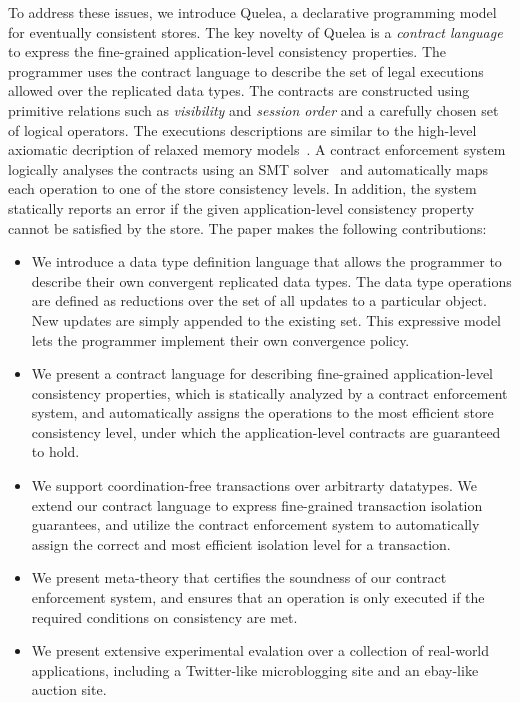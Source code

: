 \documentclass[pldi]{sigplanconf}
\begin{document}
To address these issues, we introduce Quelea, a declarative programming model
for eventually consistent stores. The key novelty of Quelea is a \emph{contract
language} to express the fine-grained application-level consistency properties.
The programmer uses the contract language to describe the set of legal
executions allowed over the replicated data types. The contracts are
constructed using primitive relations such as \emph{visibility} and
\emph{session order} and a carefully chosen set of logical operators. The
executions descriptions are similar to the high-level axiomatic decription of
relaxed memory models~\cite{Demange2013}. A contract enforcement system
logically analyses the contracts using an SMT solver~\cite{} and automatically
maps each operation to one of the store consistency levels. In addition, the
system statically reports an error if the given application-level consistency
property cannot be satisfied by the store. The paper makes the following
contributions:

\begin{itemize}

\item We introduce a data type definition language that allows the programmer
to describe their own convergent replicated data types. The data type
operations are defined as reductions over the set of all updates to a
particular object. New updates are simply appended to the existing set. This
expressive model lets the programmer implement their own convergence policy.

\item We present a contract language for describing fine-grained
application-level consistency properties, which is statically analyzed by a
contract enforcement system, and automatically assigns the operations to the
most efficient store consistency level, under which the application-level
contracts are guaranteed to hold.

\item We support coordination-free transactions over arbitrarty datatypes. We
extend our contract language to express fine-grained transaction isolation
guarantees, and utilize the contract enforcement system to automatically assign
the correct and most efficient isolation level for a transaction.

\item We present meta-theory that certifies the soundness of our contract
enforcement system, and ensures that an operation is only executed if the
required conditions on consistency are met.

\item We present extensive experimental evalation over a collection of
real-world applications, including a Twitter-like microblogging site and an
ebay-like auction site.

\end{itemize}
\end{document}
